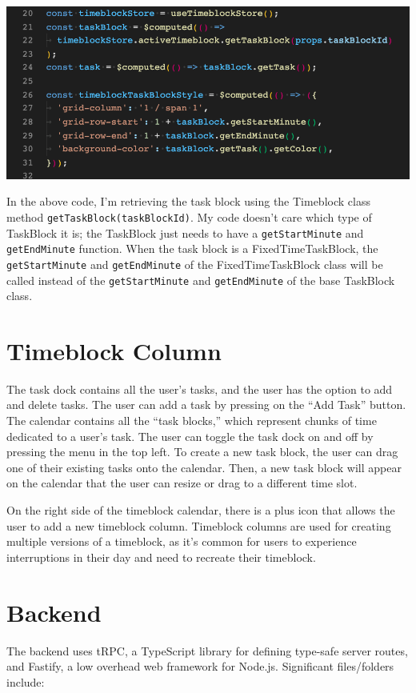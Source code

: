 \documentclass[notitlepage, 12pt]{report}
\newcommand{\code}[1]{\texttt{#1}}
\begin{document}
\includegraphics[width=1\textwidth]{polymorphism.png}

In the above code, I'm retrieving the task block using the Timeblock class method \code{getTaskBlock(taskBlockId)}. My code doesn't care which type of TaskBlock it is; the TaskBlock just needs to have a \code{getStartMinute} and \code{getEndMinute} function. When the task block is a FixedTimeTaskBlock, the \code{getStartMinute} and \code{getEndMinute} of the FixedTimeTaskBlock class will be called instead of the \code{getStartMinute} and \code{getEndMinute} of the base TaskBlock class.

\section*{Timeblock Column}


The task dock contains all the user's tasks, and the user has the option to add and delete tasks. The user can add a task by pressing on the “Add Task” button. The calendar contains all the “task blocks,” which represent chunks of time dedicated to a user's task. The user can toggle the task dock on and off by pressing the menu in the top left. To create a new task block, the user can drag one of their existing tasks onto the calendar. Then, a new task block will appear on the calendar that the user can resize or drag to a different time slot.

On the right side of the timeblock calendar, there is a plus icon that allows the user to add a new timeblock column. Timeblock columns are used for creating multiple versions of a timeblock, as it's common for users to experience interruptions in their day and need to recreate their timeblock.

\section*{Backend}
The backend uses tRPC, a TypeScript library for defining type-safe server routes, and Fastify, a low overhead web framework for Node.js. Significant files/folders include:
\end{document}

